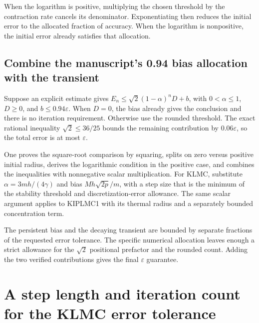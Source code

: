 \documentclass[11pt,a4paper]{report}
\begin{document}
When the logarithm is positive, multiplying the chosen threshold by the contraction rate cancels its denominator. Exponentiating then reduces the initial error to the allocated fraction of accuracy. When the logarithm is nonpositive, the initial error already satisfies that allocation.

\subsection{\texorpdfstring{Combine the manuscript's 0.94 bias allocation with the transient}{Combine the manuscript's 0.94 bias allocation with the transient}}
\label{report-step-KineticLangevin-Complexity-lean-4}


Suppose an explicit estimate gives \(E_n\le\sqrt2(1-\alpha)^nD+b\), with \(0<\alpha\le1\), \(D\ge0\), and \(b\le0.94\varepsilon\). When \(D=0\), the bias already gives the conclusion and there is no iteration requirement. Otherwise use the rounded threshold. The exact rational inequality \(\sqrt2\le36/25\) bounds the remaining contribution by \(0.06\varepsilon\), so the total error is at most \(\varepsilon\).



One proves the square-root comparison by squaring, splits on zero versus positive initial radius, derives the logarithmic condition in the positive case, and combines the inequalities with nonnegative scalar multiplication. For KLMC, substitute \(\alpha=3mh/(4\gamma)\) and bias \(Mh\sqrt{2p}/m\), with a step size that is the minimum of the stability threshold and discretization-error allowance. The same scalar argument applies to KIPLMC1 with its thermal radius and a separately bounded concentration term.



The persistent bias and the decaying transient are bounded by separate fractions of the requested error tolerance. The specific numerical allocation leaves enough a strict allowance for the \(\sqrt2\) positional prefactor and the rounded count. Adding the two verified contributions gives the final \(\varepsilon\) guarantee.

\section{\texorpdfstring{A step length and iteration count for the KLMC error tolerance}{A step length and iteration count for the KLMC error tolerance}}
\label{proof-module-KineticLangevin-Accuracy-lean}
\end{document}
